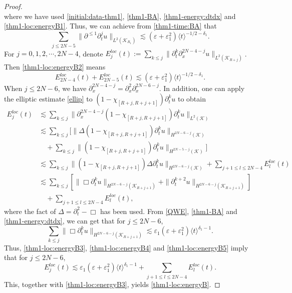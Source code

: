 \documentclass[11pt,twoside]{article}
\def\cK{\mathcal K}
\def\ds{\displaystyle}
\def\p{\partial}
\def\ve{\varepsilon}
\def\ls{\lesssim}
\newcommand{\w}[1]{\langle {#1} \rangle}
\theoremstyle{plain}
\theoremstyle{definition}
\numberwithin{equation}{section}
\begin{document}
\begin{proof}
\begin{equation*}
\end{equation*}
where we have used \eqref{initial:data-thm1}, \eqref{thm1-BA}, \eqref{thm1-energy:dtdx} and \eqref{thm1-loc:energyB1}.
Thus, we can achieve from \eqref{thm1-time:BA} that
\begin{equation}\label{thm1-loc:energyB2}
\sum_{j\le2N-5}\|\p^{\le1}\p_t^ju\|_{L^2(\cK_{R_1})}\ls(\ve+\ve_1^2)\w{t}^{-1/2-\delta_1}.
\end{equation}
For $j=0,1,2,\cdots,2N-4$, denote $\ds E_j^{loc}(t):=\sum_{k\le j}\|\p_t^k\p_x^{2N-4-j}u\|_{L^2(\cK_{R+j})}$.
Then \eqref{thm1-loc:energyB2} means
\begin{equation}\label{thm1-loc:energyB3}
E_{2N-4}^{loc}(t)+E_{2N-5}^{loc}(t)\ls(\ve+\ve_1^2)\w{t}^{-1/2-\delta_1}.
\end{equation}
When $j\le2N-6$, we have $\p_x^{2N-4-j}=\p_x^2\p_x^{2N-6-j}$.
In addition, one can apply the elliptic estimate \eqref{ellip} to $(1-\chi_{[R+j,R+j+1]})\p_t^{k}u$
to obtain
\begin{equation}\label{thm1-loc:energyB4}
\begin{split}
E_j^{loc}(t)&\ls\sum_{k\le j}\|\p_x^{2N-4-j}(1-\chi_{[R+j,R+j+1]})\p_t^ku\|_{L^2(\cK)}\\
&\ls\sum_{k\le j}[\|\Delta(1-\chi_{[R+j,R+j+1]})\p_t^ku\|_{H^{2N-6-j}(\cK)}\\
&\quad+\sum_{k\le j}\|(1-\chi_{[R+j,R+j+1]})\p_t^ku\|_{H^{2N-5-j}(\cK)}]\\
&\ls\sum_{k\le j}\|(1-\chi_{[R+j,R+j+1]})\Delta\p_t^ku\|_{H^{2N-6-j}(\cK)}+\sum_{j+1\le l\le2N-4}E_l^{loc}(t)\\
&\ls\sum_{k\le j}[\|\Box\p_t^ku\|_{H^{2N-6-j}(\cK_{R+j+1})}+\|\p_t^{k+2}u\|_{H^{2N-6-j}(\cK_{R+j+1})}]\\
&\quad+\sum_{j+1\le l\le2N-4}E_l^{loc}(t),
\end{split}
\end{equation}
where the fact of $\Delta=\p_t^2-\Box$ has been used.
From \eqref{QWE}, \eqref{thm1-BA} and \eqref{thm1-energy:dtdx}, we can get that for $j\le2N-6$,
\begin{equation}\label{thm1-loc:energyB5}
\sum_{k\le j}\|\Box\p_t^ku\|_{H^{2N-6-j}(\cK_{R+j+1})}\ls\ve_1(\ve+\ve_1^2)\w{t}^{\delta_1-1}.
\end{equation}
Thus, \eqref{thm1-loc:energyB3}, \eqref{thm1-loc:energyB4} and \eqref{thm1-loc:energyB5} imply that for $j\le2N-6$,
\begin{equation*}
E_j^{loc}(t)\ls\ve_1(\ve+\ve_1^2)\w{t}^{\delta_1-1}+\sum_{j+1\le l\le2N-4}E_l^{loc}(t).
\end{equation*}
This, together with \eqref{thm1-loc:energyB3}, yields \eqref{thm1-loc:energyB}.
\end{proof}
\end{document}
